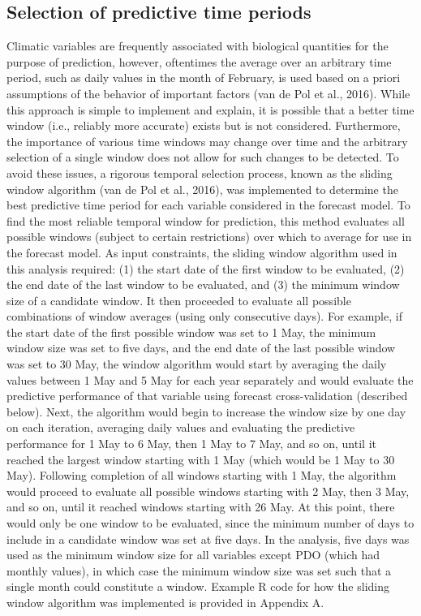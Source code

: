 \documentclass[12pt,]{book}
\theoremstyle{definition}
\theoremstyle{definition}
\theoremstyle{definition}
\theoremstyle{remark}
\begin{document}
\subsection{Selection of predictive time periods}\label{clim-windows}

Climatic variables are frequently associated with biological quantities
for the purpose of prediction, however, oftentimes the average over an
arbitrary time period, such as daily values in the month of February, is
used based on a priori assumptions of the behavior of important factors
(van de Pol et al., 2016). While this approach is simple to implement
and explain, it is possible that a better time window (i.e., reliably
more accurate) exists but is not considered. Furthermore, the importance
of various time windows may change over time and the arbitrary selection
of a single window does not allow for such changes to be detected. To
avoid these issues, a rigorous temporal selection process, known as the
sliding window algorithm (van de Pol et al., 2016), was implemented to
determine the best predictive time period for each variable considered
in the forecast model. To find the most reliable temporal window for
prediction, this method evaluates all possible windows (subject to
certain restrictions) over which to average for use in the forecast
model. As input constraints, the sliding window algorithm used in this
analysis required: (1) the start date of the first window to be
evaluated, (2) the end date of the last window to be evaluated, and (3)
the minimum window size of a candidate window. It then proceeded to
evaluate all possible combinations of window averages (using only
consecutive days). For example, if the start date of the first possible
window was set to 1 May, the minimum window size was set to five days,
and the end date of the last possible window was set to 30 May, the
window algorithm would start by averaging the daily values between 1 May
and 5 May for each year separately and would evaluate the predictive
performance of that variable using forecast cross-validation (described
below). Next, the algorithm would begin to increase the window size by
one day on each iteration, averaging daily values and evaluating the
predictive performance for 1 May to 6 May, then 1 May to 7 May, and so
on, until it reached the largest window starting with 1 May (which would
be 1 May to 30 May). Following completion of all windows starting with 1
May, the algorithm would proceed to evaluate all possible windows
starting with 2 May, then 3 May, and so on, until it reached windows
starting with 26 May. At this point, there would only be one window to
be evaluated, since the minimum number of days to include in a candidate
window was set at five days. In the analysis, five days was used as the
minimum window size for all variables except PDO (which had monthly
values), in which case the minimum window size was set such that a
single month could constitute a window. Example R code for how the
sliding window algorithm was implemented is provided in Appendix A.
\end{document}
